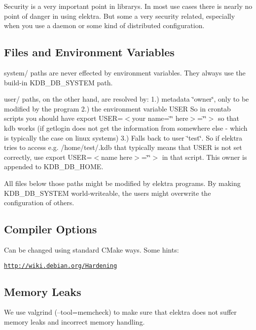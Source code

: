 Security is a very important point in librarys. In most use cases there is nearly no point of danger in using elektra. But some a very security related, especially when you use a daemon or some kind of distributed configuration.

\subsection*{Files and Environment Variables}

system/ paths are never effected by environment variables. They always use the build-\/in K\+D\+B\+\_\+\+D\+B\+\_\+\+S\+Y\+S\+T\+E\+M path.

user/ paths, on the other hand, are resolved by\+: 1.) metadata \char`\"{}owner\char`\"{}, only to be modified by the program 2.) the environment variable U\+S\+E\+R So in crontab scripts you should have export U\+S\+E\+R=$<$your name=\char`\"{}\char`\"{} here$>$=\char`\"{}\char`\"{}$>$ so that kdb works (if getlogin does not get the information from somewhere else -\/ which is typically the case on linux systems) 3.) Falls back to user \char`\"{}test\char`\"{}. So if elektra tries to access e.\+g. /home/test/.kdb that typically means that U\+S\+E\+R is not set correctly, use export U\+S\+E\+R=$<$name here$>$=\char`\"{}\char`\"{}$>$ in that script. This owner is appended to K\+D\+B\+\_\+\+D\+B\+\_\+\+H\+O\+M\+E.

All files below those paths might be modified by elektra programs. By making K\+D\+B\+\_\+\+D\+B\+\_\+\+S\+Y\+S\+T\+E\+M world-\/writeable, the users might overwrite the configuration of others.

\subsection*{Compiler Options}

Can be changed using standard C\+Make ways. Some hints\+:

\href{http://wiki.debian.org/Hardening}{\tt http\+://wiki.\+debian.\+org/\+Hardening}

\subsection*{Memory Leaks}

We use valgrind (--tool=memcheck) to make sure that elektra does not suffer memory leaks and incorrect memory handling. 